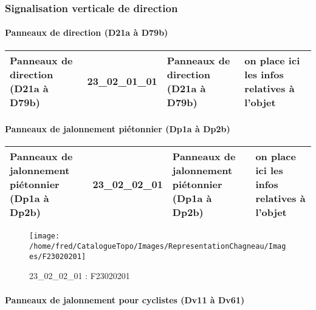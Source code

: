\documentclass[12pt,titlepage,oneside]{book}
\begin{document}
\subsubsection{\large Signalisation verticale de direction}
\paragraph{Panneaux de direction (D21a à D79b)}
\noindent
\vspace{\baselineskip}

\renewcommand{\arraystretch}{1.2}
\begin{supertabular}{|p{10cm}|c|p{13cm}|p{12cm}|}
 Panneaux de direction (D21a à D79b) & 23\_02\_01\_01 & Panneaux de direction (D21a à D79b) & on place ici les infos relatives à l'objet\\
\hline
\end{supertabular}
\begin{figure}[h!]
  \hfill         %
\end{figure}


\paragraph{Panneaux de jalonnement piétonnier (Dp1a à Dp2b)}
\noindent
\vspace{\baselineskip}

\renewcommand{\arraystretch}{1.2}
\begin{supertabular}{|p{10cm}|c|p{13cm}|p{12cm}|}
 Panneaux de jalonnement piétonnier (Dp1a à Dp2b) & 23\_02\_02\_01 & Panneaux de jalonnement piétonnier (Dp1a à Dp2b) & on place ici les infos relatives à l'objet\\
\hline
\end{supertabular}
\begin{figure}[h!]
  \hfill         %
  \begin{minipage}[t]{3cm}
    \begin{center}
      \texttt{[image: /home/fred/CatalogueTopo/Images/RepresentationChagneau/Images/F23020201]}
      \caption[F23020201]{\label{} 23\_02\_02\_01 : F23020201}
    \end{center}
  \end{minipage}
\end{figure}


\paragraph{Panneaux de jalonnement pour cyclistes (Dv11 à Dv61)}
\noindent
\vspace{\baselineskip}
\end{document}
